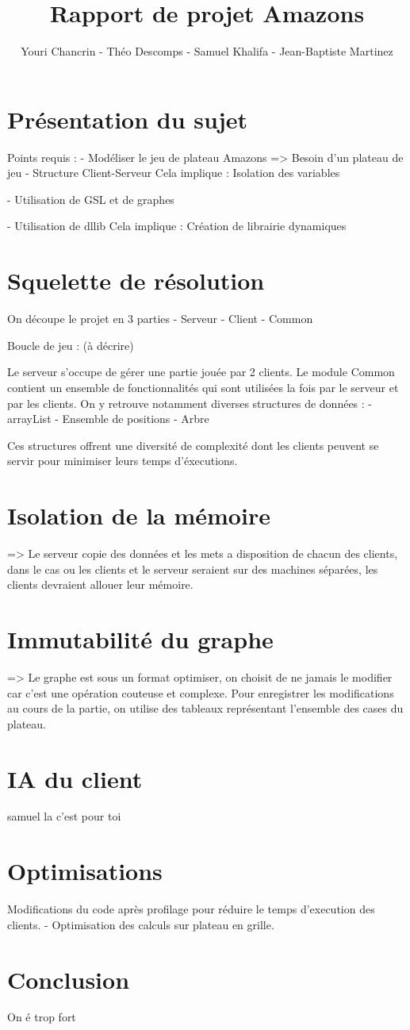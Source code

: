 \documentclass{article}
\author{Youri Chancrin - Théo Descomps - Samuel Khalifa - Jean-Baptiste Martinez}
\title{Rapport de projet Amazons}
\begin{document}
\maketitle

\section{Présentation du sujet}

Points requis :
- Modéliser le jeu de plateau Amazons
=> Besoin d'un plateau de jeu
- Structure Client-Serveur
Cela implique : Isolation des variables

- Utilisation de GSL et de graphes

- Utilisation de dllib
Cela implique : Création de librairie dynamiques

\section{Squelette de résolution}
On découpe le projet en 3 parties
- Serveur
- Client
- Common

Boucle de jeu : (à décrire)

Le serveur s'occupe de gérer une partie jouée par 2 clients. 
Le module Common contient un ensemble de fonctionnalités qui sont 
utilisées la fois par le serveur et par les clients. On y retrouve 
notamment diverses structures de données :
- arrayList
- Ensemble de positions
- Arbre

Ces structures offrent une diversité de complexité dont les clients 
peuvent se servir pour minimiser leurs temps d'éxecutions.

\section{Isolation de la mémoire}
=> Le serveur copie des données et les mets a disposition de chacun
des clients, dans le cas ou les clients et le serveur seraient sur 
des machines séparées, les clients devraient allouer leur mémoire.

\section{Immutabilité du graphe}
=> Le graphe est sous un format optimiser, on choisit de ne jamais 
le modifier car c'est une opération couteuse et complexe. Pour 
enregistrer les modifications au cours de la partie, on utilise des 
tableaux représentant l'ensemble des cases du plateau.

\section{IA du client}
samuel la c'est pour toi

\section{Optimisations}
Modifications du code après profilage pour réduire le temps 
d'execution des clients.
- Optimisation des calculs sur plateau en grille.


\section{Conclusion}
On é trop fort
\end{document}
